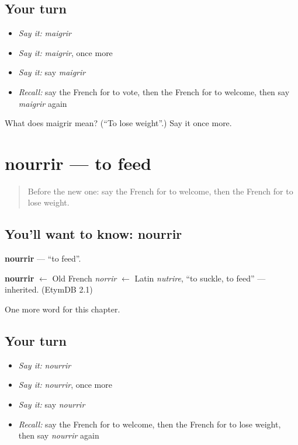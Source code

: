 \subsection*{Your turn}
\begin{itemize}
\raggedright
  \item \emph{Say it:} \emph{maigrir}
  \item \emph{Say it:} \emph{maigrir}, once more
  \item \emph{Say it:} say \emph{maigrir}
  \item \emph{Recall:} say the French for to vote, then the French for to welcome, then say \emph{maigrir} again
\end{itemize}

\begin{tcolorbox}[breakable,colback=teal!4,colframe=teal!35!black,title={Before you move on}]
What does maigrir mean? (\textquotedblleft{}To lose weight\textquotedblright{}.) Say it once more.
\end{tcolorbox}
\section[nourrir]{nourrir — to feed}

\label{lesson:FR-C242-nourrir}



\begin{quote}
Before the new one: say the French for to welcome, then the French for to lose weight.
\end{quote}

\subsection*{You'll want to know: nourrir}
\textbf{nourrir} — \textquotedblleft{}to feed\textquotedblright{}.

\begin{cousinweb}
\textbf{nourrir} $\leftarrow$ Old French \emph{norrir} $\leftarrow$ Latin \emph{nutrire}, \textquotedblleft{}to suckle, to feed\textquotedblright{} — inherited. (EtymDB 2.1)
\end{cousinweb}

\begin{grammarlens}[title={What you've built}]
One more word for this chapter.
\end{grammarlens}

\subsection*{Your turn}
\begin{itemize}
\raggedright
  \item \emph{Say it:} \emph{nourrir}
  \item \emph{Say it:} \emph{nourrir}, once more
  \item \emph{Say it:} say \emph{nourrir}
  \item \emph{Recall:} say the French for to welcome, then the French for to lose weight, then say \emph{nourrir} again
\end{itemize}

